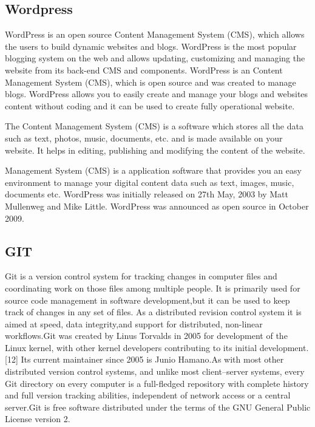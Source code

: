 \documentclass[a4paper,12pt]{article}
\begin{document}
\subsection{Wordpress}\vspace{5mm}
WordPress is an open source Content Management System (CMS), which allows the users to build dynamic websites and blogs. WordPress is the most popular blogging system on the web and allows updating, customizing and managing the website from its back-end CMS and components. 
WordPress is an Content Management System (CMS), which is open source and was created to manage blogs. WordPress allows you to easily create and manage your blogs and websites content without coding and it can be used to create fully operational website. 
\par\vspace{2mm}
The Content Management System (CMS) is a software which stores all the data such as text, photos, music, documents, etc. and is made available on your website. It helps in editing, publishing and modifying the content of the website.
\par\vspace{2mm}
Management System (CMS) is a application software that provides you an easy environment to manage your digital content data such as text, images, music, documents etc. 
WordPress was initially released on 27th May, 2003 by Matt Mullenweg and Mike Little. WordPress was announced as open source in October 2009. 
\par\vspace{2mm}

\subsection{GIT}\vspace{2mm}
Git  is a version control system for tracking changes in computer files and coordinating work on those files among multiple people. It is primarily used for source code management in software development,but it can be used to keep track of changes in any set of files. As a distributed revision control system it is aimed at speed, data integrity,and support for distributed, non-linear workflows.Git was created by Linus Torvalds in 2005 for development of the Linux kernel, with other kernel developers contributing to its initial development.[12] Its current maintainer since 2005 is Junio Hamano.As with most other distributed version control systems, and unlike most client–server systems, every Git directory on every computer is a full-fledged repository with complete history and full version tracking abilities, independent of network access or a central server.Git is free software distributed under the terms of the GNU General Public License version 2.
\newpage
\end{document}
